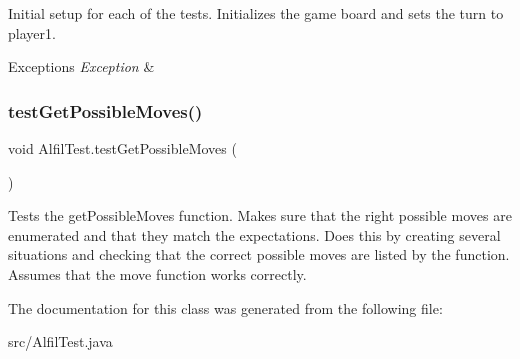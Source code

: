 Initial setup for each of the tests. Initializes the game board and sets the turn to player1. 
\begin{DoxyExceptions}{Exceptions}
{\em Exception} & \\
\hline
\end{DoxyExceptions}
\mbox{\label{class_alfil_test_a2cf7e21629af8f626baa28cab4f8ca6d}} 
\subsubsection{\texorpdfstring{test\+Get\+Possible\+Moves()}{testGetPossibleMoves()}}
{\footnotesize\ttfamily void Alfil\+Test.\+test\+Get\+Possible\+Moves (\begin{DoxyParamCaption}{ }\end{DoxyParamCaption})}

Tests the get\+Possible\+Moves function. Makes sure that the right possible moves are enumerated and that they match the expectations. Does this by creating several situations and checking that the correct possible moves are listed by the function. Assumes that the move function works correctly. 

The documentation for this class was generated from the following file\+:\begin{DoxyCompactItemize}
\item 
src/Alfil\+Test.\+java\end{DoxyCompactItemize}
